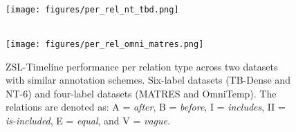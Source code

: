 \begin{figure}[t]
    \centering

    \parbox{0.95\linewidth}{ %
         \\ %
        \texttt{[image: figures/per\_rel\_nt\_tbd.png]}
    }

    \vspace{0.5cm} %

    \parbox{0.95\linewidth}{
         \\ %
        \texttt{[image: figures/per\_rel\_omni\_matres.png]}
    }

    \caption{ZSL-Timeline performance per relation type across two datasets with similar annotation schemes. Six-label datasets (TB-Dense and NT-6) and four-label datasets (MATRES and OmniTemp).
    The relations are denoted as: A = \textit{after}, B = \textit{before}, I = \textit{includes}, II = \textit{is-included}, E = \textit{equal}, and V = \textit{vague}.}
    \label{fig:per-rel-expr}
\end{figure}